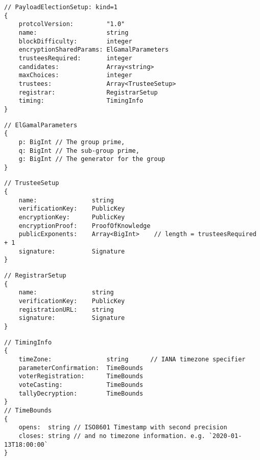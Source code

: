 \label{dt:payload:setup}
\begin{lstlisting}[style=ES6]
// PayloadElectionSetup: kind=1
{
    protcolVersion:         "1.0"
    name:                   string
    blockDifficulty:        integer
    encryptionSharedParams: ElGamalParameters
    trusteesRequired:       integer
    candidates:             Array<string>
    maxChoices:             integer
    trustees:               Array<TrusteeSetup>
    registrar:              RegistrarSetup
    timing:                 TimingInfo
}
\end{lstlisting}
\vspace*{-0.95em}
\label{dt:elgamal:params}
\begin{lstlisting}[style=ES6, firstnumber=last]
// ElGamalParameters
{
    p: BigInt // The group prime,
    q: BigInt // The sub-group prime,
    g: BigInt // The generator for the group
}
\end{lstlisting}
\newpage
\label{dt:trustee}
\begin{lstlisting}[style=ES6, firstnumber=last]
// TrusteeSetup
{
    name:               string
    verificationKey:    PublicKey
    encryptionKey:      PublicKey
    encryptionProof:    ProofOfKnowledge
    publicExponents:    Array<BigInt>    // length = trusteesRequired + 1
    signature:          Signature
}
\end{lstlisting}
\vspace*{-0.95em}
\label{dt:registrar}
\begin{lstlisting}[style=ES6, firstnumber=last]
// RegistrarSetup
{
    name:               string
    verificationKey:    PublicKey
    registrationURL:    string
    signature:          Signature
}
\end{lstlisting}
\vspace*{-0.95em}
\label{dt:timing}
\begin{lstlisting}[style=ES6, firstnumber=last]
// TimingInfo
{
    timeZone:               string      // IANA timezone specifier
    parameterConfirmation:  TimeBounds
    voterRegistration:      TimeBounds
    voteCasting:            TimeBounds
    tallyDecryption:        TimeBounds
}
// TimeBounds
{
    opens:  string // ISO8601 Timestamp with second precision
    closes: string // and no timezone information. e.g. `2020-01-13T18:00:00`
}
\end{lstlisting}

